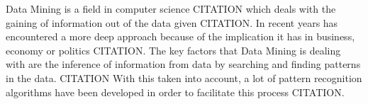 
Data Mining is a field in computer science CITATION which deals with the gaining of information out of the data given CITATION. 
In recent years has encountered a more deep approach because of the implication it has in business, economy or politics CITATION.
The key factors that Data Mining is dealing with are the inference of information from data by searching and finding patterns in the data.
CITATION With this taken into account, a lot of pattern recognition algorithms have been developed in order to facilitate this process CITATION.

